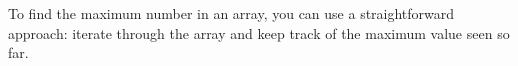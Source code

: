 \documentclass[preview]{standalone}
\begin{document}
To find the maximum number in an array, you can use a straightforward approach: iterate through the array and keep track of the maximum value seen so far.\\
\end{document}
